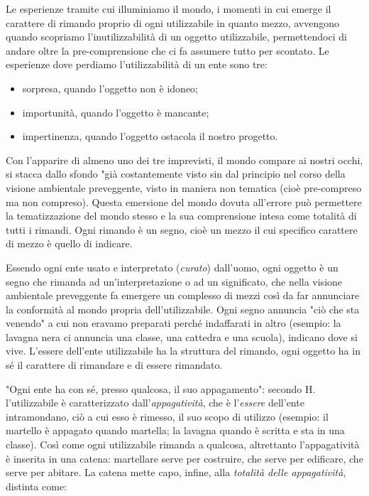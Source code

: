 \documentclass[a4paper,12pt,oneside]{article}%
\begin{document}
Le esperienze tramite cui illuminiamo il mondo, i momenti in cui emerge il carattere di rimando proprio di ogni utilizzabile in quanto mezzo, avvengono quando scopriamo l'inutilizzabilità di un oggetto utilizzabile, permettendoci di andare oltre la pre-comprensione che ci fa assumere tutto per scontato. Le esperienze dove perdiamo l'utilizzabilità di un ente sono tre:

\begin{itemize}
	\item sorpresa, quando l'oggetto non è idoneo;
	\item importunità, quando l'oggetto è mancante;
	\item impertinenza, quando l'oggetto ostacola il nostro progetto.
\end{itemize}

Con l'apparire di almeno uno dei tre imprevisti, il mondo compare ai nostri occhi, si stacca dallo sfondo "già costantemente visto sin dal principio nel corso della visione ambientale preveggente, visto in maniera non tematica (cioè pre-compreso ma non compreso). Questa emersione del mondo dovuta all'errore può permettere la tematizzazione del mondo stesso e la sua comprensione intesa come totalità di tutti i rimandi. Ogni rimando è un segno, cioè un mezzo il cui specifico carattere di mezzo è quello di indicare. 

Essendo ogni ente usato e interpretato (\textit{curato}) dall'uomo, ogni oggetto è un segno che rimanda ad un'interpretazione o ad un significato, che nella visione ambientale preveggente fa emergere un complesso di mezzi così da far annunciare la conformità al mondo propria dell'utilizzabile. Ogni segno annuncia "ciò che sta venendo" a cui non eravamo preparati perché indaffarati in altro (esempio: la lavagna nera ci annuncia una classe, una cattedra e una scuola), indicano dove si vive.
L'essere dell'ente utilizzabile ha la struttura del rimando, ogni oggetto ha in sé il carattere di rimandare e di essere rimandato. 

"Ogni ente ha con sé, presso qualcosa, il suo appagamento": secondo H. l'utilizzabile è caratterizzato dall'\textit{appagatività}, che è l'\textit{essere} dell'ente intramondano, ciò a cui esso è rimesso, il suo scopo di utilizzo (esempio: il martello è appagato quando martella; la lavagna quando è scritta e sta in una classe). Così come ogni utilizzabile rimanda a qualcosa, altrettanto l'appagatività è inserita in una catena: martellare serve per costruire, che serve per edificare, che serve per abitare. La catena mette capo, infine, alla \textit{totalità delle appagatività}, distinta come:
\end{document}

